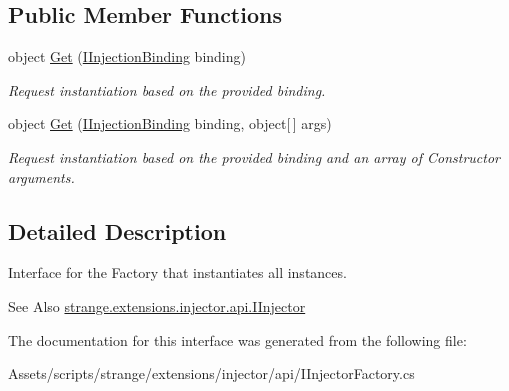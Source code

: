 \subsection*{Public Member Functions}
\begin{DoxyCompactItemize}
\item 
\hypertarget{interfacestrange_1_1extensions_1_1injector_1_1api_1_1_i_injector_factory_acbb92c191690effea5d246427c71dd3c}{object \hyperlink{interfacestrange_1_1extensions_1_1injector_1_1api_1_1_i_injector_factory_acbb92c191690effea5d246427c71dd3c}{Get} (\hyperlink{interfacestrange_1_1extensions_1_1injector_1_1api_1_1_i_injection_binding}{I\-Injection\-Binding} binding)}\label{interfacestrange_1_1extensions_1_1injector_1_1api_1_1_i_injector_factory_acbb92c191690effea5d246427c71dd3c}

\begin{DoxyCompactList}\small\item\em Request instantiation based on the provided binding. \end{DoxyCompactList}\item 
\hypertarget{interfacestrange_1_1extensions_1_1injector_1_1api_1_1_i_injector_factory_ad0248c64a58e2d9a9b192fedf12f62d4}{object \hyperlink{interfacestrange_1_1extensions_1_1injector_1_1api_1_1_i_injector_factory_ad0248c64a58e2d9a9b192fedf12f62d4}{Get} (\hyperlink{interfacestrange_1_1extensions_1_1injector_1_1api_1_1_i_injection_binding}{I\-Injection\-Binding} binding, object\mbox{[}$\,$\mbox{]} args)}\label{interfacestrange_1_1extensions_1_1injector_1_1api_1_1_i_injector_factory_ad0248c64a58e2d9a9b192fedf12f62d4}

\begin{DoxyCompactList}\small\item\em Request instantiation based on the provided binding and an array of Constructor arguments. \end{DoxyCompactList}\end{DoxyCompactItemize}


\subsection{Detailed Description}
Interface for the Factory that instantiates all instances. 

\begin{DoxySeeAlso}{See Also}
\hyperlink{interfacestrange_1_1extensions_1_1injector_1_1api_1_1_i_injector}{strange.\-extensions.\-injector.\-api.\-I\-Injector} 
\end{DoxySeeAlso}


The documentation for this interface was generated from the following file\-:\begin{DoxyCompactItemize}
\item 
Assets/scripts/strange/extensions/injector/api/I\-Injector\-Factory.\-cs\end{DoxyCompactItemize}
